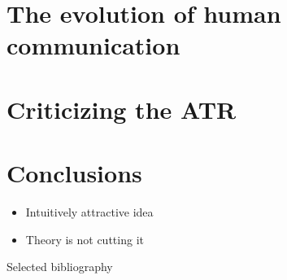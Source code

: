 \documentclass[xcolor=table]{beamer}       %
\begin{document}
\section{The evolution of human communication}

\begin{frame}{\insertsection}
\end{frame}

\section{Criticizing the ATR}

\begin{frame}{\insertsection}
\end{frame}

\section{Conclusions}

\begin{frame}{\insertsection}
    \begin{itemize}
        \item Intuitively attractive idea
        \item Theory is not cutting it
    \end{itemize}
\end{frame}

\begin{frame}{Selected bibliography}
    \nocite{MS11, Tomasello09, Sperber01, Sperber10}
    \printbibliography
\end{frame}
\end{document}

